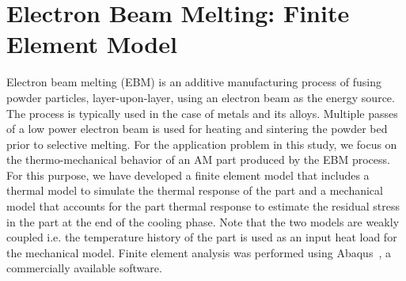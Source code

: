 \section{Electron Beam Melting: Finite Element Model}
\label{sec:model}

Electron beam melting (EBM) is an additive manufacturing process of fusing powder particles, layer-upon-layer, 
using an electron beam as the energy source. The process is typically used in the case of metals and its alloys.
Multiple passes of  a low power electron beam is used for heating and sintering the powder bed prior to selective
melting. For the application problem in this study, we focus on the thermo-mechanical behavior of an AM part
produced by the EBM process. For this purpose, we have developed a finite element model that includes a thermal
model to simulate the thermal response of the part and a mechanical model that accounts for the part thermal
response to estimate the residual stress in the part at the end of the cooling phase. Note that the two models are
weakly coupled i.e. the temperature history of the part is used as an input heat load for the mechanical model. 
Finite element analysis was performed using Abaqus~\cite{Hibbitt:2001}, a commercially available software. 

